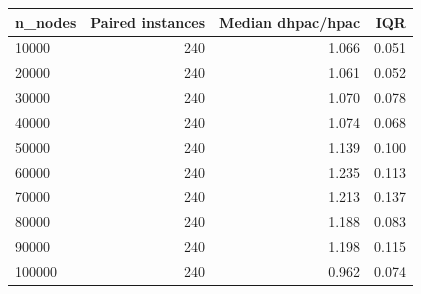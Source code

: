 \begin{tabular}{lrrr}
\toprule
n\_nodes & Paired instances & Median dhpac/hpac & IQR \\
\midrule
10000 & 240 & 1.066 & 0.051 \\
20000 & 240 & 1.061 & 0.052 \\
30000 & 240 & 1.070 & 0.078 \\
40000 & 240 & 1.074 & 0.068 \\
50000 & 240 & 1.139 & 0.100 \\
60000 & 240 & 1.235 & 0.113 \\
70000 & 240 & 1.213 & 0.137 \\
80000 & 240 & 1.188 & 0.083 \\
90000 & 240 & 1.198 & 0.115 \\
100000 & 240 & 0.962 & 0.074 \\
\bottomrule
\end{tabular}
